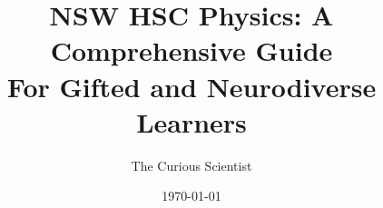 \documentclass[justified]{tufte-book}
\title{NSW HSC Physics: A Comprehensive Guide\\
\large For Gifted and Neurodiverse Learners}
\author{The Curious Scientist}
\date{\today}
\begin{document}
\maketitle


\FloatBarrier


\FloatBarrier


\FloatBarrier


\FloatBarrier


\FloatBarrier


\FloatBarrier


\FloatBarrier


\FloatBarrier


\FloatBarrier
\end{document}
